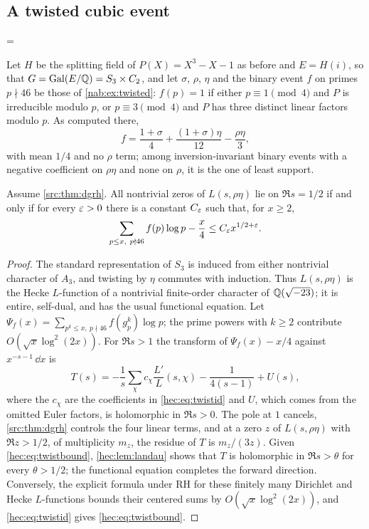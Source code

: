 \subsection{A twisted cubic event}\label{hec:ss:othercubic}
{\emergencystretch=\textwidth{}}

Let $H$ be the splitting field of $P(X)=X^3-X-1$ as before and $E=H(i)$, so that
$G=\operatorname{Gal}(E/\mathbb{Q})=S_3\times C_2$, and let $\sigma$, $\rho$, $\eta$ and the binary event $f$ on primes
$p\nmid46$ be those of \cref{nab:ex:twisted}: $f(p)=1$ if either $p\equiv1\pmod4$ and $P$ is irreducible
modulo $p$, or $p\equiv3\pmod4$ and $P$ has three distinct linear factors modulo $p$. As computed there,
\begin{equation}\label{hec:eq:twistid}
 f=\frac{1+\sigma}4+\frac{(1+\sigma)\eta}{12}-\frac{\rho\eta}3 ,
\end{equation}
with mean $1/4$ and no $\rho$ term; among inversion-invariant binary events with a negative coefficient
on $\rho\eta$ and none on $\rho$, it is the one of least support.

\begin{theorem}\label{hec:thm:twistedcubic}
Assume \cref{src:thm:dgrh}. All nontrivial zeros of $L(s,\rho\eta)$ lie on $\Re s=1/2$ if and only if for
every $\varepsilon>0$ there is a constant $C_\varepsilon$ such that, for $x\ge2$,
\begin{equation}\label{hec:eq:twistbound}
 \sum_{p\le x,\ p\nmid46}f(p)\log p-\frac x4\le C_\varepsilon x^{1/2+\varepsilon}.
\end{equation}
\end{theorem}

\begin{proof}
The standard representation of $S_3$ is induced from either nontrivial character of $A_3$, and twisting by
$\eta$ commutes with induction. Thus $L(s,\rho\eta)$ is the Hecke $L$-function of a nontrivial finite-order
character of $\mathbb{Q}(\sqrt{-23})$; it is entire, self-dual, and has the usual functional equation. Let
$\Psi_f(x)=\sum_{p^k\le x,\ p\nmid46}f(g_p^k)\log p$; the prime powers with $k\ge2$ contribute
$O(\sqrt x\log^2(2x))$. For $\Re s>1$ the transform of $\Psi_f(x)-x/4$ against $x^{-s-1}\,\dd x$ is
\[
 T(s)=-\frac1s\sum_\chi c_\chi\frac{L'}L(s,\chi)-\frac1{4(s-1)}+U(s),
\]
where the $c_\chi$ are the coefficients in \eqref{hec:eq:twistid} and $U$, which comes from the omitted
Euler factors, is holomorphic in $\Re s>0$. The pole at $1$ cancels, \cref{src:thm:dgrh} controls the four
linear terms, and at a zero $z$ of $L(s,\rho\eta)$ with $\Re z>1/2$, of multiplicity $m_z$, the residue of
$T$ is $m_z/(3z)$. Given \eqref{hec:eq:twistbound}, \cref{hec:lem:landau} shows that $T$ is holomorphic in
$\Re s>\theta$ for every $\theta>1/2$; the functional equation completes the forward direction. Conversely,
the explicit formula under RH for these finitely many Dirichlet and Hecke $L$-functions bounds their
centered sums by $O(\sqrt x\log^2(2x))$, and \eqref{hec:eq:twistid} gives \eqref{hec:eq:twistbound}.
\end{proof}

